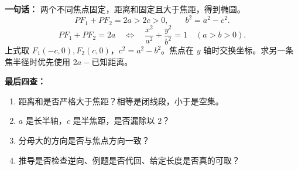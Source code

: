 \begin{summarybox}
\textbf{一句话：} 两个不同焦点固定，距离和固定且大于焦距，得到椭圆。
\[
PF_1+PF_2=2a>2c>0,\qquad b^2=a^2-c^2.
\]
\[
PF_1+PF_2=2a\quad\Longleftrightarrow\quad
\frac{x^2}{a^2}+\frac{y^2}{b^2}=1\quad(a>b>0).
\]
上式取 $F_1(-c,0),F_2(c,0)$，$c^2=a^2-b^2$。焦点在 $y$ 轴时交换坐标。求另一条焦半径时优先使用 $2a-\text{已知距离}$。

\textbf{最后四查：}
\begin{enumerate}[leftmargin=*]
\item 距离和是否严格大于焦距？相等是闭线段，小于是空集。
\item $a$ 是长半轴，$c$ 是半焦距，是否漏除以 $2$？
\item 分母大的方向是否与焦点方向一致？
\item 推导是否检查逆向、例题是否代回、给定长度是否真的可取？
\end{enumerate}
\end{summarybox}
